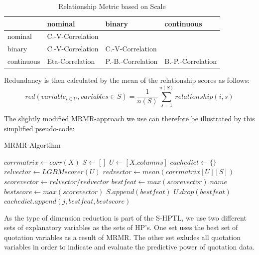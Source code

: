 \documentclass[12pt,titlepage]{article}
\begin{document}
\setlength{\tabcolsep}{10pt} %
\renewcommand{\arraystretch}{1.2}
\begin{center}
\begin{table}[H]
    \begin{tabular}{|l|lll|}
    \hline
     & nominal & binary & continuous      \\
    \hline
    nominal                & C.-V-Correlation &         &                 \\
    binary            & C.-V-Correlation & C.-V-Correlation &                 \\
    continuous             & Eta-Correlation & P.-B.-Correlation & B.-P.-Correlation \\
    \hline
    \end{tabular}
    \caption{Relationship Metric based on Scale}
\label{redtable}
\end{table}
\end{center}
\noindent
Redundancy is then calculated by the mean of the relationship scores as follows:
\vspace{5mm}
\noindent
\begin{equation} \label{redundancy}
    red(variable_{i \in U}, variables \in S) = \frac{1}{n(S)} \sum_{s=1}^{n(S)} relationship(i, s)
\end{equation}
\vspace{1mm}

\noindent
The slightly modified MRMR-approach we use can therefore be illustrated by this simplified pseudo-code: \\
\begin{algorithm}[H]
\caption{MRMR-Algortihm}\label{alg:mrmr}
\begin{algorithmic}
    \State $corrmatrix \gets corr(X)$
    \State $S \gets \left[ \right]$
    \State $U \gets \left[X.columns\right]$
    \State $cachedict \gets \{\}$
        \State $relvector \gets LGBMscorer(U)$
        \State $redvector \gets mean(corrmatrix\left[U\right]\left[S\right])$
        \State $scorevector \gets relvector/redvector$
        \State $bestfeat \gets max(scorevector).name$
        \State $bestscore \gets max(scorevector)$
        \State $S.append(bestfeat)$
        \State $U.drop(bestfeat)$
        \State $cachedict.append(j,bestfeat, bestscore)$
    \EndFor
\end{algorithmic}
\end{algorithm}
\vspace{1mm}

As the type of dimension reduction is part of the S-HPTL, we use two different sets of explanatory variables as the sets of HP's. One set uses the best set of quotation variables as a result of MRMR. The other set exludes all quotation variables in order to indicate and evaluate the predictive power of quotation data. \\
\end{document}
